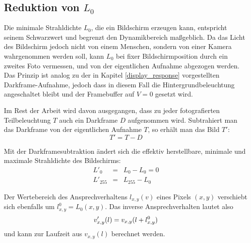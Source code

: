    
\subsection{Reduktion von $L_{0}$}   \label{reduktion} 
     Die minimale Strahldichte $L_{0}$, die ein Bildschirm erzeugen kann, entspricht seinem Schwarzwert und begrenzt den Dynamikbereich maßgeblich.
     Da das Licht des Bildschirm jedoch nicht von einem Menschen, sondern von einer Kamera wahrgenommen werden soll, kann $L_{0}$ bei fixer Bildschirmposition durch ein zweites Foto vermessen, und von der eigentlichen Aufnahme abgezogen werden.
     Das Prinzip ist analog zu der in Kapitel \ref{display_response} vorgestellten Darkframe-Aufnahme, jedoch dass in diesem Fall die Hintergrundbeleuchtung angeschaltet bleibt und der Framebuffer auf $V=0$ gesetzt wird.

     Im Rest der Arbeit wird davon ausgegangen, dass zu jeder fotografierten Teilbeleuchtung $T$ auch ein Darkframe $D$ aufgenommen wird. 
     Subtrahiert man das Darkframe von der eigentlichen Aufnahme $T$, so erhält man das Bild $T'$:
    \begin{equation}
        T'  = T - D
    \end{equation}

    Mit der Darkframesubtraktion ändert sich die effektiv herstellbare, minimale und maximale Strahldichte des Bildschirms: 
    \begin{eqnarray*}
        L'_{0} &=& L_0 - L_0 = 0 \\
        L'_{255} &=& L_{255} - L_0
    \end{eqnarray*}
    
     Der Wertebereich des Ansprechverhaltens $l_{x,y}(v)$ eines Pixels $(x,y)$ verschiebt sich ebenfalls um $l^0_{x,y} = L_0(x,y)$.
     Das inverse Ansprechverhalten lautet also 
     \begin{equation}
        v'_{x,y}(l) = v_{x,y}(l+l^0_{x,y}) \\
    \end{equation}
     und kann zur Laufzeit aus $v_{x,y}(l)$ berechnet werden.
    

